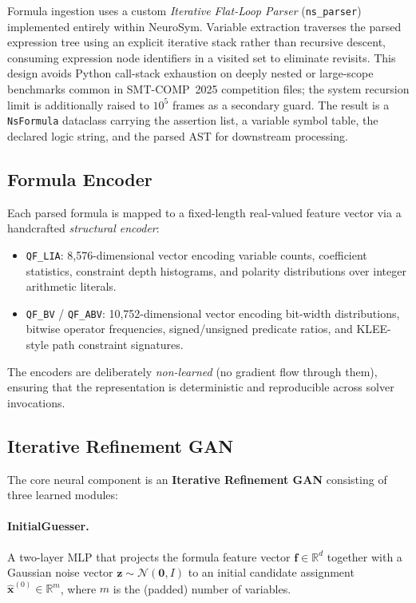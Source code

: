 \documentclass[10pt,a4paper]{article}
\begin{document}
Formula ingestion uses a custom \emph{Iterative Flat-Loop Parser}
(\texttt{ns\_parser}) implemented entirely within NeuroSym.  Variable
extraction traverses the parsed expression tree using an explicit iterative
stack rather than recursive descent, consuming expression node identifiers in
a visited set to eliminate revisits.  This design avoids Python call-stack
exhaustion on deeply nested or large-scope benchmarks common in
SMT-COMP~2025 competition files; the system recursion limit is additionally
raised to $10^{5}$ frames as a secondary guard.  The result is a
\texttt{NsFormula} dataclass carrying the assertion list, a variable symbol
table, the declared logic string, and the parsed AST for downstream
processing.

\subsection{Formula Encoder}

Each parsed formula is mapped to a fixed-length real-valued feature vector
via a handcrafted \emph{structural encoder}:

\begin{itemize}
  \item \texttt{QF\_LIA}: 8,576-dimensional vector encoding variable counts,
        coefficient statistics, constraint depth histograms, and polarity
        distributions over integer arithmetic literals.
  \item \texttt{QF\_BV} / \texttt{QF\_ABV}: 10,752-dimensional vector
        encoding bit-width distributions, bitwise operator frequencies,
        signed/unsigned predicate ratios, and KLEE-style path constraint
        signatures.
\end{itemize}

The encoders are deliberately \emph{non-learned} (no gradient flow through
them), ensuring that the representation is deterministic and reproducible
across solver invocations.

\subsection{Iterative Refinement GAN}

The core neural component is an \textbf{Iterative Refinement GAN} consisting
of three learned modules:

\paragraph{InitialGuesser.}  A two-layer MLP that projects the formula
feature vector $\mathbf{f} \in \mathbb{R}^{d}$ together with a Gaussian
noise vector $\mathbf{z} \sim \mathcal{N}(\mathbf{0}, I)$ to an initial
candidate assignment $\hat{\mathbf{x}}^{(0)} \in \mathbb{R}^{m}$, where $m$
is the (padded) number of variables.
\end{document}
